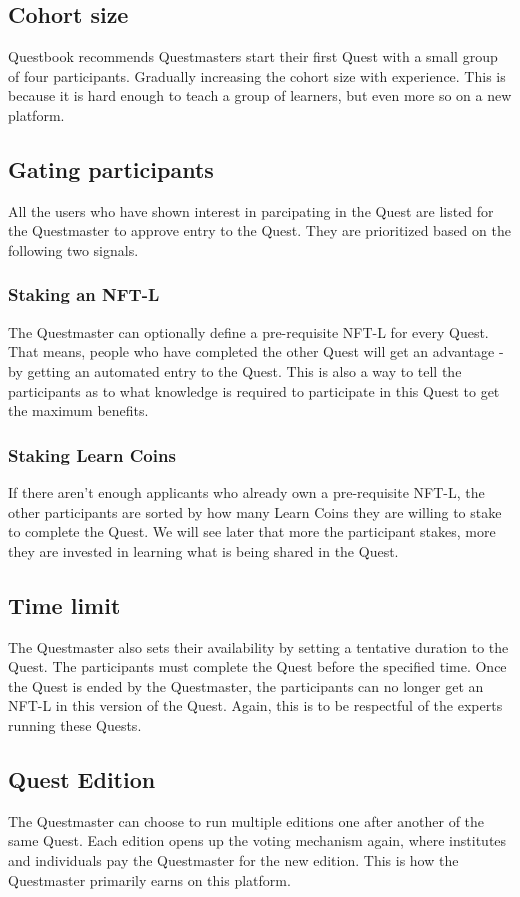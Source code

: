 \documentclass{article}
\begin{document}
    \subsection{Cohort size}
      Questbook recommends Questmasters start their first Quest with a small group of four participants. Gradually increasing the cohort size with experience. 
      This is because it is hard enough to teach a group of learners, but even more so on a new platform.
    \subsection{Gating participants}
      All the users who have shown interest in parcipating in the Quest are listed for the Questmaster to approve entry to the Quest. They are prioritized based on the following two signals.
      \subsubsection{Staking an NFT-L}
        The Questmaster can optionally define a pre-requisite NFT-L for every Quest. That means, people who have completed the other Quest will get an advantage - by getting an automated entry to the Quest.
        This is also a way to tell the participants as to what knowledge is required to participate in this Quest to get the maximum benefits. 
      \subsubsection{Staking Learn Coins}
        If there aren't enough applicants who already own a pre-requisite NFT-L, the other participants are sorted by how many Learn Coins they are willing to stake to complete the Quest.
        We will see later that more the participant stakes, more they are invested in learning what is being shared in the Quest.
    \subsection{Time limit}
      The Questmaster also sets their availability by setting a tentative duration to the Quest. The participants must complete the Quest before the specified time. Once the Quest is ended by the Questmaster, the participants can no longer get an NFT-L in this version of the Quest.
      Again, this is to be respectful of the experts running these Quests. 
    \subsection{Quest Edition}
      The Questmaster can choose to run multiple editions one after another of the same Quest. Each edition opens up the voting mechanism again, where institutes and individuals pay the Questmaster for the new edition. This is how the Questmaster primarily earns on this platform.
\end{document}
